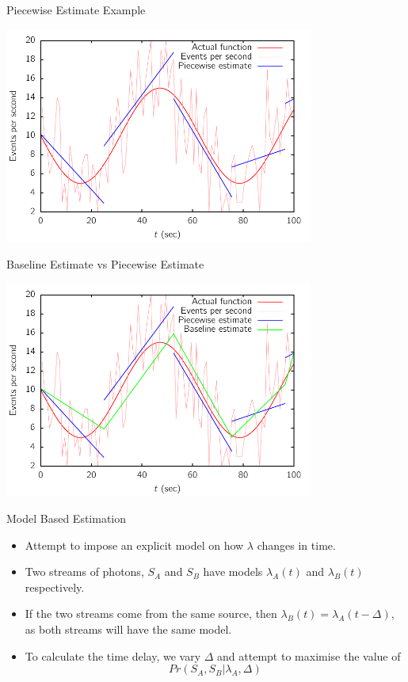\documentclass{beamer}
\begin{document}
\begin{frame}{Piecewise Estimate Example}
  \begin{center}
      \includegraphics[width=4in]{piecewise}
  \end{center}
\end{frame}

\begin{frame}{Baseline Estimate vs Piecewise Estimate}
  \begin{center}
      \includegraphics[width=4in]{baseline}
  \end{center}
\end{frame}

\begin{frame}{Model Based Estimation}
  \begin{itemize}
  \item Attempt to impose an explicit model on how $\lambda$ changes in time.
  \item Two streams of photons, $S_A$ and $S_B$ have models $\lambda_A(t)$ and $\lambda_B(t)$ respectively.
  \item If the two streams come from the same source, then $\lambda_B(t) = \lambda_A(t-\Delta)$, as both streams will have the same model.
  \item To calculate the time delay, we vary $\Delta$ and attempt to maximise the value of \[Pr(S_A,S_B|\lambda_A,\Delta)\]
  \end{itemize}
\end{frame}
\end{document}

